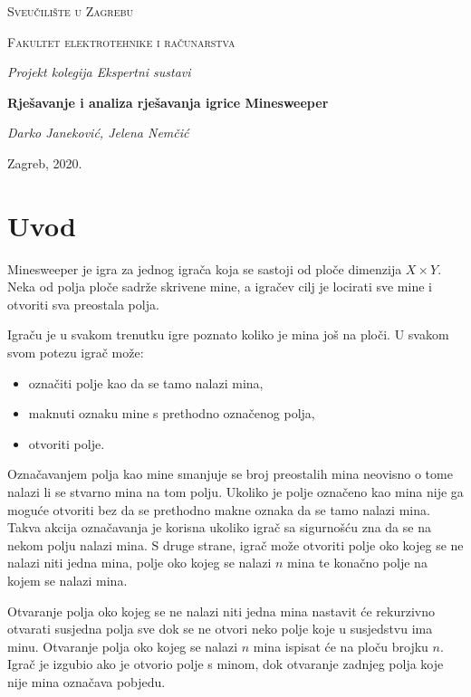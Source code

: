 \documentclass{article}
\begin{document}
\begin{titlepage}
	\centering
	{\scshape\LARGE Sveučilište u Zagrebu\par}
	\vspace{0.5cm}
	{\scshape\Large Fakultet elektrotehnike i računarstva\par}
    \vfill
	{\Large\itshape Projekt kolegija Ekspertni sustavi \par}
	\vspace{0.5cm}
	{\huge\bfseries Rješavanje i analiza rješavanja igrice Minesweeper\par}
	\vspace{0.5cm}
	{\Large\itshape Darko Janeković, Jelena Nemčić \par}
	\vfill
	{\large Zagreb, 2020.}
\end{titlepage}

\section{Uvod}

Minesweeper je igra za jednog igrača koja se sastoji od ploče dimenzija $X \times Y$. Neka od polja ploče sadrže skrivene mine, a igračev cilj je locirati sve mine i otvoriti sva preostala polja.

Igraču je u svakom trenutku igre poznato koliko je mina još na ploči. U svakom svom potezu igrač može:
\begin{itemize}
    \item označiti polje kao da se tamo nalazi mina,
    \item maknuti oznaku mine s prethodno označenog polja,
    \item otvoriti polje.
\end{itemize} 

Označavanjem polja kao mine smanjuje se broj preostalih mina neovisno o tome nalazi li se stvarno mina na tom polju. Ukoliko je polje označeno kao mina nije ga moguće otvoriti bez da se prethodno makne oznaka da se tamo
nalazi mina. Takva akcija označavanja je korisna ukoliko igrač sa sigurnošću zna da se na nekom polju
nalazi mina. S druge strane, igrač može otvoriti polje oko kojeg se ne nalazi niti jedna
mina, polje oko kojeg se nalazi $n$ mina te konačno polje na kojem se nalazi mina.

Otvaranje polja oko kojeg se ne nalazi niti jedna mina nastavit će rekurzivno otvarati susjedna
polja sve dok se ne otvori neko polje koje u susjedstvu ima minu. Otvaranje polja oko kojeg
se nalazi $n$ mina ispisat će na ploču brojku $n$. Igrač je izgubio ako je otvorio polje s minom, dok otvaranje zadnjeg polja koje nije mina
označava pobjedu.
\end{document}
